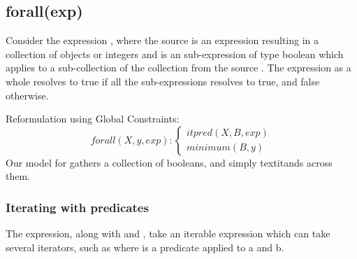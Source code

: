 \newpage\subsection{forall(exp)}
Consider the expression , where the source  is an expression resulting in a collection of objects or integers and  is an sub-expression of type boolean which applies to a sub-collection of the collection from the source .
The expression as a whole resolves to true if all the sub-expressions resolves to true, and false otherwise.

Reformulation using Global Constraints:
\begin{equation}\label{csp:forall}
    forall(X,y,exp):
    \begin{cases}
        itpred(X,B,exp)\\
        minimum(B,y)
    \end{cases}
\end{equation}
Our model for  gathers a collection of booleans, and simply textit{ands} across them.

\subsubsection{Iterating with predicates}
The  expression, along with  and , take an iterable expression which can take several iterators, such as  where  is a predicate applied to a and b.

